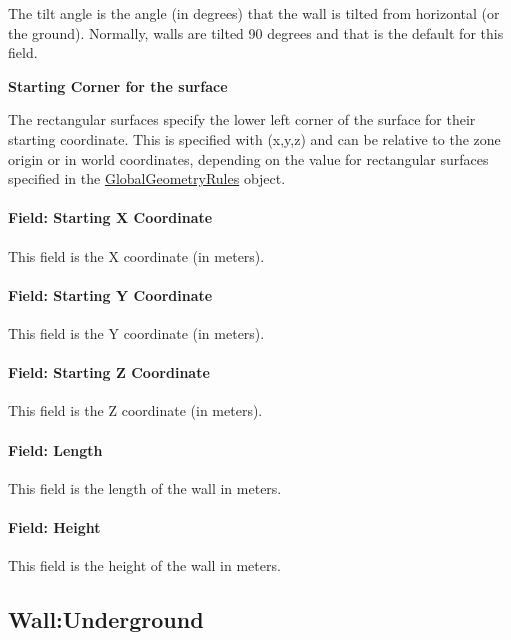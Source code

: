 The tilt angle is the angle (in degrees) that the wall is tilted from horizontal (or the ground). Normally, walls are tilted 90 degrees and that is the default for this field.

\begin{callout}
\textbf{Starting Corner for the surface}

The rectangular surfaces specify the lower left corner of the surface for their starting coordinate. This is specified with (x,y,z) and can be relative to the zone origin or in world coordinates, depending on the value for rectangular surfaces specified in the \hyperref[globalgeometryrules]{GlobalGeometryRules} object.
\end{callout}

\paragraph{Field: Starting X Coordinate}\label{field-starting-x-coordinate-1}

This field is the X coordinate (in meters).

\paragraph{Field: Starting Y Coordinate}\label{field-starting-y-coordinate-1}

This field is the Y coordinate (in meters).

\paragraph{Field: Starting Z Coordinate}\label{field-starting-z-coordinate-1}

This field is the Z coordinate (in meters).

\paragraph{Field: Length}\label{field-length-1}

This field is the length of the wall in meters.

\paragraph{Field: Height}\label{field-height-1}

This field is the height of the wall in meters.

\subsection{Wall:Underground}\label{wallunderground}

